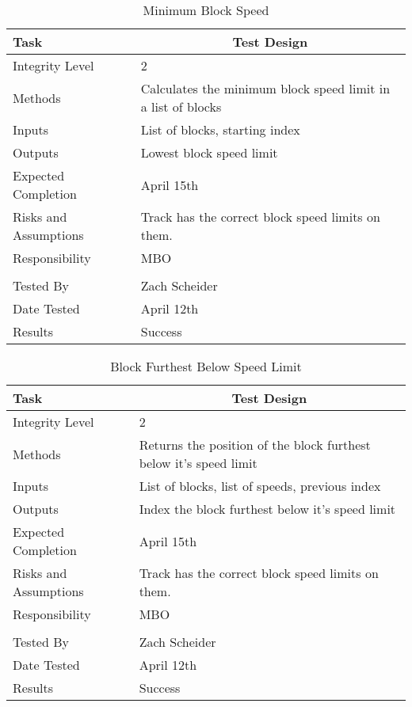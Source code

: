 \documentclass[]{article}
\begin{document}
\begin{table}[H]
	\centering
	\caption{Minimum Block Speed}
	\begin{tabular}{|l|l|}
		\hline
		Task & \multicolumn{1}{c|}{Test Design} \\ \hline
		Integrity Level & 2 \\ \hline
		Methods & Calculates the minimum block speed limit in a list of blocks\\ \hline
		Inputs &  List of blocks, starting index\\ \hline
		Outputs &  Lowest block speed limit \\ \hline
		Expected Completion & \parbox[t]{10cm}{April 15th}\\ \hline
		Risks and Assumptions & \parbox[t]{10cm}{Track has the correct block speed limits on them.} \\ \hline
		Responsibility & MBO\\ \hline
			\\ \hline
		Tested By   &  Zach Scheider\\	\hline
		Date Tested & \parbox[t]{10cm}{April 12th}\\ \hline
		Results & Success\\ \hline
	\end{tabular}
\end{table}

\begin{table}[H]
	\centering
	\caption{Block Furthest Below Speed Limit}
	\begin{tabular}{|l|l|}
		\hline
		Task & \multicolumn{1}{c|}{Test Design} \\ \hline
		Integrity Level & 2 \\ \hline
		Methods & Returns the position of the block furthest below it's speed limit\\ \hline
		Inputs &  List of blocks, list of speeds, previous index\\ \hline
		Outputs &  Index the block furthest below it's speed limit \\ \hline
		Expected Completion & \parbox[t]{10cm}{April 15th}\\ \hline
		Risks and Assumptions & \parbox[t]{10cm}{Track has the correct block speed limits on them.} \\ \hline
		Responsibility & MBO\\ \hline
		\\ \hline
		Tested By   &  Zach Scheider\\	\hline
		Date Tested & \parbox[t]{10cm}{April 12th}\\ \hline
		Results & Success\\ \hline
	\end{tabular}
\end{table}
\end{document}

